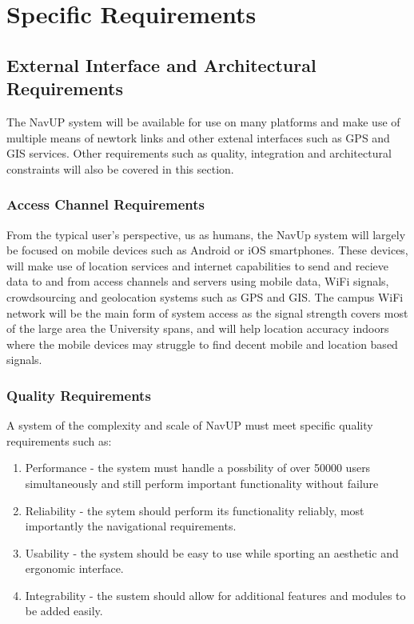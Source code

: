 \documentclass[12pt,a4paper]{report}
\begin{document}
\newpage
\section*{Specific Requirements}

	\subsection*{External Interface and Architectural Requirements}
		
		The NavUP system will be available for use on many platforms and make use of multiple means of newtork links and other extenal interfaces such as GPS and GIS services.
		Other requirements such as quality, integration and architectural constraints will also be covered in this section.
		
			\subsubsection*{Access Channel Requirements}
				From the typical user's perspective, us as humans, the NavUp system will largely be focused on mobile devices such as Android or iOS smartphones.
				These devices, will make use of location services and internet capabilities to send and recieve data to and from access channels and servers using mobile data,
				WiFi signals, crowdsourcing and geolocation systems such as GPS and GIS. The campus WiFi network will be the main form of system access as the signal
				strength covers most of the large area the University spans, and will help location accuracy indoors where the mobile devices may struggle to find decent mobile
				and location based signals.
				
			\subsubsection*{Quality Requirements}
				A system of the complexity and scale of NavUP must meet specific quality requirements such as:
				
				\begin{enumerate}
				\renewcommand{\labelenumi}{{\textbf{\arabic{enumi}.}}}
				\item Performance - the system must handle a possbility of over 50000 users simultaneously and still perform important functionality without failure
				\item Reliability - the sytem should perform its functionality reliably, most importantly the navigational requirements.
				\item Usability - the system should be easy to use while sporting an aesthetic and ergonomic interface.
				\item Integrability - the sustem should allow for additional features and modules to be added easily.
				\end{enumerate}
				
\end{document}
